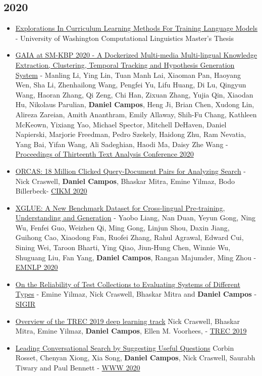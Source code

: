 \documentclass[line,margin]{res}
\begin{document}
\begin{resume}
\subsection{2020}
\begin{itemize}
    \item \href{https://spacemanidol.github.io/cv/UWTHESIS.pdf}{Explorations In Curriculum Learning Methods For Training Language Models} - University of Washington Computational Linguistics Master's Thesis
    \item \href{https://research.yyx.me/publications/tac2020.pdf}{GAIA at SM-KBP 2020 - A Dockerized Multi-media Multi-lingual Knowledge Extraction, Clustering, Temporal Tracking and Hypothesis Generation System} - Manling Li, Ying Lin, Tuan Manh Lai, Xiaoman Pan, Haoyang Wen, Sha Li, Zhenhailong Wang, Pengfei Yu, Lifu Huang, Di Lu, Qingyun Wang, Haoran Zhang, Qi Zeng, Chi Han, Zixuan Zhang, Yujia Qin, Xiaodan Hu, Nikolaus Parulian, \textbf{Daniel Campos}, Heng Ji, Brian Chen, Xudong Lin, Alireza Zareian, Amith Ananthram, Emily Allaway, Shih-Fu Chang, Kathleen McKeown, Yixiang Yao, Michael Spector, Mitchell DeHaven, Daniel Napierski, Marjorie Freedman, Pedro Szekely, Haidong Zhu, Ram Nevatia, Yang Bai, Yifan Wang, Ali Sadeghian, Haodi Ma, Daisy Zhe Wang - \href{tac.nist.gov}{Proceedings of Thirteenth Text Analysis Conference 2020}
    \item \href{https://arxiv.org/abs/2006.05324}{ORCAS: 18 Million Clicked Query-Document Pairs for Analyzing Search} - Nick Craswell, \textbf{Daniel Campos}, Bhaskar Mitra, Emine Yilmaz, Bodo Billerbeck- \href{https://www.cikm2020.org/}{CIKM 2020}
    \item \href{https://arxiv.org/abs/2004.01401}{XGLUE: A New Benchmark Dataset for Cross-lingual Pre-training, Understanding and Generation} - Yaobo Liang, Nan Duan, Yeyun Gong, Ning Wu, Fenfei Guo, Weizhen Qi, Ming Gong, Linjun Shou, Daxin Jiang, Guihong Cao, Xiaodong Fan, Ruofei Zhang, Rahul Agrawal, Edward Cui, Sining Wei, Taroon Bharti, Ying Qiao, Jiun-Hung Chen, Winnie Wu, Shuguang Liu, Fan Yang, \textbf{Daniel Campos}, Rangan Majumder, Ming Zhou - \href{https://2020.emnlp.org/}{EMNLP 2020}
    \item \href{https://arxiv.org/pdf/2004.13486.pdf}{On the Reliability of Test Collections to Evaluating Systems of Different Types} - Emine Yilmaz, Nick Craswell, Bhaskar Mitra and \textbf{Daniel Campos} - \href{https://sigir.org/sigir2020/}{SIGIR} 
    \item \href{https://arxiv.org/abs/2003.07820}{Overview of the TREC 2019 deep learning track} Nick Craswell, Bhaskar Mitra, Emine Yilmaz, \textbf{Daniel Campos}, Ellen M. Voorhees, - \href{https://trec.nist.gov/tracks.html}{TREC 2019}
	\item \href{https://www.microsoft.com/en-us/research/publication/leading-conversational-search-by-suggesting-useful-questions/}{Leading Conversational Search by Suggesting Useful Questions} Corbin Rosset, Chenyan Xiong, Xia Song, \textbf{Daniel Campos}, Nick Craswell, Saurabh Tiwary and Paul Bennett - \href{https://www2020.thewebconf.org/}{WWW 2020}
\end{itemize}

\end{resume}
\end{document}
